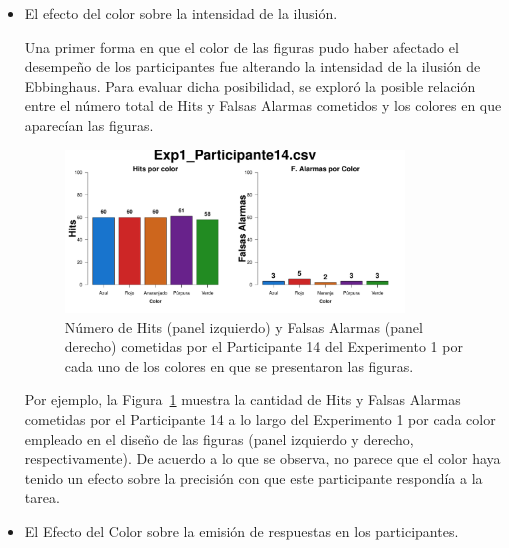\begin{itemize}
	\item El efecto del color sobre la intensidad de la ilusión.

Una primer forma en que el color de las figuras pudo haber afectado el desempeño de los participantes fue alterando la intensidad de la ilusión de Ebbinghaus. Para evaluar dicha posibilidad, se exploró la posible relación entre el número total de Hits y Falsas Alarmas cometidos y los colores en que aparecían las figuras.\\

\begin{figure}[th]
\centering
\includegraphics[width=0.85\textwidth]{Figures/Color_Exp1_P14}
\decoRule
\caption[Explorando datos individuales (ejemplo): Relación entre los Hits y las Falsas Alarmas registradas y el color de las figuras]{Número de Hits (panel izquierdo) y Falsas Alarmas (panel derecho) cometidas por el Participante 14 del Experimento 1 por cada uno de los colores en que se presentaron las figuras.}
\label{fig:Color_E1_P14}
\end{figure}

Por ejemplo, la Figura~\ref{fig:Color_E1_P14} muestra la cantidad de Hits y Falsas Alarmas cometidas por el Participante 14 a lo largo del Experimento 1 por cada color empleado en el diseño de las figuras (panel izquierdo y derecho, respectivamente). De acuerdo a lo que se observa, no parece que el color haya tenido un efecto sobre la precisión con que este participante respondía a la tarea.\\


	\item El Efecto del Color sobre la emisión de respuestas en los participantes.


\end{itemize}
